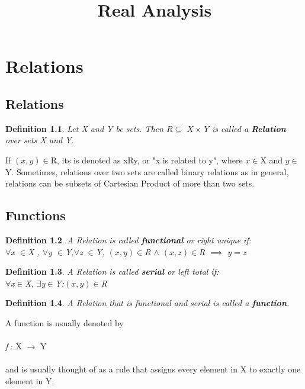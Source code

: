 \documentclass{report}
\begin{document}
\title{Real Analysis}

\newtheorem{definition}{Definition}[section]
\newtheorem{axiom}{Axiom}[section]
\newtheorem{theorem}{Theorem}[section]

\maketitle
\chapter{Relations}
\section{Relations}

\begin{definition}
Let X and Y be sets. Then $R\subseteq$ $X\times$Y is called a \textbf{Relation} over sets X and Y.
\end{definition}
If $(x,y)\in $R, its is denoted as xRy, or "x is related to y", where $x \in $X and $y \in $Y. Sometimes, relations over two sets are called binary relations as in general, relations can be subsets of Cartesian Product of more than two sets.

\section{Functions}
\begin{definition}
A Relation is called \textbf{functional} or right unique if:\\
$\forall $x $\in $X , $\forall $y $\in $Y,$\forall $z $\in $Y, $(x,y)\in $R $\wedge$ $(x,z)\in $R $\implies$ $y=$z
\end{definition}

\begin{definition}
A Relation is called \textbf{serial} or left total if:\\
$\forall $x$\in $X, $\exists $y$\in $Y:$(x,y) \in $R
\end{definition}

\begin{definition}
A Relation that is functional and serial is called a \textbf{function}.
\end{definition}
A function is usually denoted by\\
\\
\emph{f} : X $\rightarrow$ Y\\
\\
and is usually thought of as a rule that assigns every element in X to exactly one element in Y.
\end{document}
